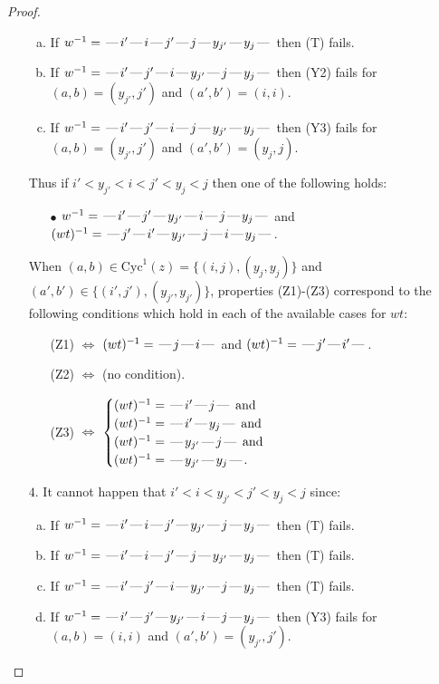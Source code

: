 \documentclass[10pt]{article}
\theoremstyle{definition}
\theoremstyle{definition}
\def\dash{\text{\hspace{0.5mm}---\hspace{0.5mm}}}
\def\Cyc{\mathrm{Cyc}}
\begin{document}
\begin{proof}
\begin{enumerate}
\begin{enumerate}[(a)]
\item If $w^{-1} = \dash i'\dash i\dash j'\dash j\dash y_{j'}\dash y_j\dash $ then (T) fails.
\item If $w^{-1} = \dash i'\dash j'\dash i\dash y_{j'}\dash j\dash y_j\dash $ then (Y2) fails for $(a,b)=(y_{j'},j')$ and $(a',b')=(i,i)$.
\item If $w^{-1} = \dash i'\dash j'\dash i\dash j\dash y_{j'}\dash y_j\dash $ then (Y3) fails for $(a,b)=(y_{j'},j')$ and $(a',b')=(y_j,j)$.
\end{enumerate}
Thus if $i' < y_{j'} < i < j' < y_j < j$ then one of the following holds:
\begin{enumerate}
\item[$\bullet$] $w^{-1} = \dash i'\dash j'\dash y_{j'}\dash i\dash j\dash y_j\dash $ and $(wt)^{-1} = \dash j'\dash i'\dash y_{j'}\dash j\dash i\dash y_j\dash $.
\end{enumerate}
When $(a,b)\in\Cyc^1(z)=\{(i,j),(y_j,y_j)\}$ and $(a',b')\in\{(i',j'),(y_{j'},y_{j'})\}$,
properties (Z1)-(Z3) correspond to the following conditions which
hold in each of the available cases for $wt$:
\begin{enumerate}
\item[](Z1) $\Leftrightarrow$ $(wt)^{-1} = \dash j \dash i \dash$  and $(wt)^{-1} = \dash j' \dash i' \dash$.
\item[](Z2) $\Leftrightarrow$ (no condition).
\item[](Z3) $\Leftrightarrow$ $\begin{cases}\text{$(wt)^{-1} = \dash i' \dash j \dash$}\text{ and }\\
\text{$(wt)^{-1} = \dash i' \dash y_j \dash$}\text{ and }\\
\text{$(wt)^{-1} = \dash y_{j'} \dash j \dash$}\text{ and }\\
\text{$(wt)^{-1} = \dash y_{j'} \dash y_j \dash$}.\end{cases}$
\end{enumerate}
\item[$4$.] It cannot happen that $i' < i < y_{j'} < j' < y_j < j$ since:
\begin{enumerate}[(a)]
\item If $w^{-1} = \dash i'\dash i\dash j'\dash y_{j'}\dash j\dash y_j\dash $ then (T) fails.
\item If $w^{-1} = \dash i'\dash i\dash j'\dash j\dash y_{j'}\dash y_j\dash $ then (T) fails.
\item If $w^{-1} = \dash i'\dash j'\dash i\dash y_{j'}\dash j\dash y_j\dash $ then (T) fails.
\item If $w^{-1} = \dash i'\dash j'\dash y_{j'}\dash i\dash j\dash y_j\dash $ then (Y3) fails for $(a,b)=(i,i)$ and $(a',b')=(y_{j'},j')$.

\end{enumerate}
\end{enumerate}
\end{proof}
\end{document}
